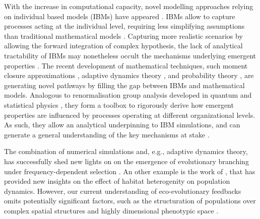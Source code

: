 With the increase in computational capacity, novel modelling approaches relying on individual based models (IBMs) have appeared \cite{deangelis2005individual}. IBMs allow to capture processes acting at the individual level, requiring less simplifying assumptions than traditional mathematical models \cite{deangelis2005individual}. Capturing more realistic scenarios by allowing the forward integration of complex hypothesis, the lack of analytical tractability of IBMs may nonetheless occult the mechanisms underlying emergent properties \cite{Lion2016,May2004}.
% 
The recent development of mathematical techniques, such moment closure approximations \cite{law1999moment,Gandhi2000,Nordbotten2020,Lion2016}, adaptive dynamics theory \cite{Metz1995}, and probability theory \cite{Champagnat2006}, are generating novel pathways by filling the gap between IBMs and mathematical models. 
% 
% 
Analogous to renormalisation group analysis developed in quantum and statistical physics \cite{Sayama}, they form a toolbox to rigorously derive how emergent properties are influenced by processes operating at different organizational levels. As such, they allow an analytical underpinning to IBM simulations, and can generate a general understanding of the key mechanisms at stake \cite{Lion2016}.

The combination of numerical simulations and, e.g., adaptive dynamics theory, has successfully shed new lights on on the emergence of evolutionary branching under frequency-dependent selection \cite{Dieckmann1999,Doebeli2003}.
%
An other example is the work of \cite{Meszena1997,Debarre2013a, Mirrahimi2020}, that has provided new insights on the effect of habitat heterogenity on population dynamics. 
% 
However, our current understanding of eco-evolutionary feedbacks omits potentially significant factors, such as the structuration of populations over complex spatial structures \cite{XX} and highly dimensional phenotypic space \cite{XXX}.

